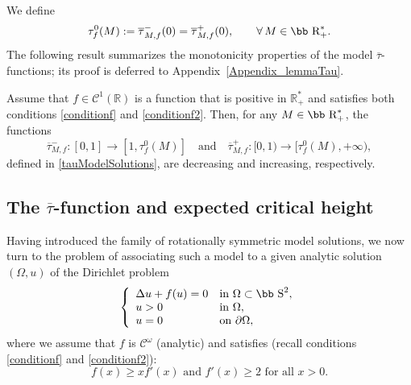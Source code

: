 \documentclass[11pt]{article}
\def\r{\hbox{\bb R}}
\def\s{\hbox{\bb S}}
\numberwithin{equation} {section}
\begin{document}
We define
\[
\tau_f^0 (M) := \overline{\tau}_{M,f}^- (0) = \overline{\tau}_{M,f}^+ (0),
\qquad \forall\, M \in \r_+^*.
\]
The following result summarizes the monotonicity properties of the model $\overline{\tau}$-functions; its proof is deferred to Appendix~\ref{Appendix_lemmaTau}.
\begin{lemma}\label{lemmaTau}
Assume that $f\in \mathcal{C}^1(\mathbb{R})$ is a function that is positive in $\mathbb{R}^*_+$ and satisfies both conditions \eqref{conditionf} and \eqref{conditionf2}. Then, for any $M\in \r_+^*$, the functions
\[
\overline{\tau}_{M,f}^- : [0,1] \longrightarrow [1,\tau_f^0(M)]
\quad \text{and} \quad
\overline{\tau}_{M,f}^+ : [0,1) \longrightarrow [\tau_f^0(M),+\infty),
\]
defined in \eqref{tauModelSolutions}, are decreasing and increasing, respectively.
\end{lemma}

\subsection{The $\overline{\tau}$-function and expected critical height}\label{sectionTau}
Having introduced the family of rotationally symmetric model solutions, we now turn to the problem of associating such a model to a given analytic solution $(\Omega ,u)$ of the Dirichlet problem
\begin{eqnarray} \label{DP}
	\left\{
	\begin{array}{llll}
		\Delta u + f(u) = 0  &\text{in}~\Omega \subset \s ^2,\\
		u > 0  &\text{in}~\Omega, \\
		u = 0  &\text{on}~\partial \Omega ,
	\end{array}
	\right.
\end{eqnarray}
where we assume that $f$ is $\mathcal C^\omega$ (analytic) and satisfies (recall conditions \eqref{conditionf} and \eqref{conditionf2}): 
$$ f(x) \geq x f'(x)  \text{ and } f'(x) \geq 2 \text{ for all } x >0 .$$
\end{document}
